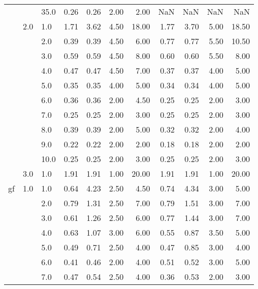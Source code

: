 \begin{tabular}{lllrrrrrrrr}
   &     & 35.0 &       0.26 &      0.26 & 2.00 &   2.00 &        NaN &       NaN &  NaN &    NaN \\
   & 2.0 & 1.0  &       1.71 &      3.62 & 4.50 &  18.00 &       1.77 &      3.70 & 5.00 &  18.50 \\
   &     & 2.0  &       0.39 &      0.39 & 4.50 &   6.00 &       0.77 &      0.77 & 5.50 &  10.50 \\
   &     & 3.0  &       0.59 &      0.59 & 4.50 &   8.00 &       0.60 &      0.60 & 5.50 &   8.00 \\
   &     & 4.0  &       0.47 &      0.47 & 4.50 &   7.00 &       0.37 &      0.37 & 4.00 &   5.00 \\
   &     & 5.0  &       0.35 &      0.35 & 4.00 &   5.00 &       0.34 &      0.34 & 4.00 &   5.00 \\
   &     & 6.0  &       0.36 &      0.36 & 2.00 &   4.50 &       0.25 &      0.25 & 2.00 &   3.00 \\
   &     & 7.0  &       0.25 &      0.25 & 2.00 &   3.00 &       0.25 &      0.25 & 2.00 &   3.00 \\
   &     & 8.0  &       0.39 &      0.39 & 2.00 &   5.00 &       0.32 &      0.32 & 2.00 &   4.00 \\
   &     & 9.0  &       0.22 &      0.22 & 2.00 &   2.00 &       0.18 &      0.18 & 2.00 &   2.00 \\
   &     & 10.0 &       0.25 &      0.25 & 2.00 &   3.00 &       0.25 &      0.25 & 2.00 &   3.00 \\
   & 3.0 & 1.0  &       1.91 &      1.91 & 1.00 &  20.00 &       1.91 &      1.91 & 1.00 &  20.00 \\
gf & 1.0 & 1.0  &       0.64 &      4.23 & 2.50 &   4.50 &       0.74 &      4.34 & 3.00 &   5.00 \\
   &     & 2.0  &       0.79 &      1.31 & 2.50 &   7.00 &       0.79 &      1.51 & 3.00 &   7.00 \\
   &     & 3.0  &       0.61 &      1.26 & 2.50 &   6.00 &       0.77 &      1.44 & 3.00 &   7.00 \\
   &     & 4.0  &       0.63 &      1.07 & 3.00 &   6.00 &       0.55 &      0.87 & 3.50 &   5.00 \\
   &     & 5.0  &       0.49 &      0.71 & 2.50 &   4.00 &       0.47 &      0.85 & 3.00 &   4.00 \\
   &     & 6.0  &       0.41 &      0.46 & 2.00 &   4.00 &       0.51 &      0.52 & 3.00 &   5.00 \\
   &     & 7.0  &       0.47 &      0.54 & 2.50 &   4.00 &       0.36 &      0.53 & 2.00 &   3.00 \\

\end{tabular}
